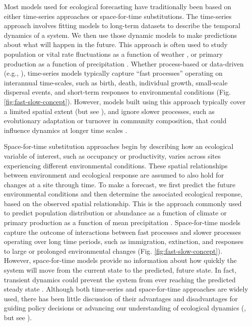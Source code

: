 \documentclass[11pt]{article}
\begin{document}
Most models used for ecological forecasting have traditionally been based on either time-series approaches or space-for-time substitutions. The time-series approach involves fitting models to long-term datasets to describe the temporal dynamics of a system.  We then use those dynamic models to make predictions about what will happen in the future. This approach is often used to study population or vital rate fluctuations as a function of weather \citep{dalgleish_climate_2011}, or primary production as a function of precipitation \citep{lauenroth_long-term_1992}. Whether process-based or data-driven (e.g., \citealt{ward_complexity_2014}), time-series models typically capture ``fast processes'' operating on interannual time-scales, such as birth, death, individual growth, small-scale dispersal events, and short-term responses to environmental conditions (Fig. \ref{fig:fast-slow-concept}). However, models built using this approach typically cover a limited spatial extent (but see \citealt{Hefley2017,kleinhesselink_response_2018}), and ignore slower processes, such as evolutionary adaptation or turnover in community composition, that could influence dynamics at longer time scales \citep{clark_ecological_2001}. 

Space-for-time substitution approaches begin by describing how an ecological variable of interest, such as occupancy or productivity,  varies across sites experiencing different environmental conditions. These spatial relationships between environment and ecological response are assumed to also hold for changes at a site through time. To make a forecast, we first predict the future environmental conditions and then determine the associated ecological response, based on the observed spatial relationship.  This is the approach commonly used to predict population distribution or abundance as a function of climate \citep{elith_species_2009} or primary production as a function of mean precipitation \citep{Sala1988}. Space-for-time models capture the outcome of interactions between fast processes and slower processes operating over long time periods, such as immigration, extinction, and responses to large or prolonged environmental changes (Fig. \ref{fig:fast-slow-concept}). However, space-for-time models provide no information about how quickly the system will move from the current state to the predicted, future state. In fact, transient dynamics could prevent the system from ever reaching the predicted steady state \citep{Urban2012}. Although both time-series and space-for-time approaches are widely used, there has been little discussion of their advantages and disadvantages for guiding policy decisions or advancing our understanding of ecological dynamics (\citealt{harris_forecasting_2018}, but see \citealt{Renwick2018}). 
\end{document}
